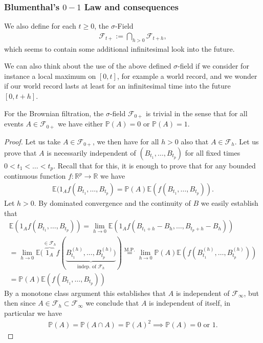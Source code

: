 \documentclass[../mainfile.tex]{subfiles}
\begin{document}
\subsubsection{Blumenthal's $0-1$ Law and consequences}
We also define for each $t \geq 0$, the $\sigma$-Field 
\begin{align*}
\mathcal{F}_{t+} := \bigcap_{h >0} \mathcal{F}_{t+h}, 
\end{align*}
which seems to contain some additional infinitesimal look into the future. 
\begin{rem} We can also think about the use of the above defined $\sigma$-field if we consider for instance a local maximum on $[0,t]$, for example a world record, and we wonder if our world record lasts at least for an infinitesimal time into the future $[0, t+h]$. 
\end{rem}
\newpage
\begin{prop} For the Brownian filtration, the $\sigma$-field $\mathcal{F}_{0+}$ is trivial in the sense that for all events $A \in \mathcal{F}_{0+}$ we have either $\mathbb{P}(A)=0$ or $\mathbb{P}(A)=1$. 
\end{prop}
\begin{proof}
Let us take $A \in \mathcal{F}_{0+}$, we then have for all $h>0$ also that $A \in \mathcal{F}_h$. Let us prove that $A$ is necessarily independent of $(B_{t_1}, \dots , B_{t_p})$ for all fixed times $0 < t_1< \dots < t_p$. Recall that for this, it is enough to prove that for any bounded continuous function $f: \mathbb{R}^p \to \mathbb{R}$ we have
\begin{align*}
\mathbb{E}(1_A f(B_{t_1},  \dots , B_{t_p}) = \mathbb{P}(A) \mathbb{E}(f (B_{t_1}, \dots , B_{t_p})).
\end{align*}
Let $h>0$. By dominated convergence and the continuity of $B$ we easily establish that 
\begin{align*}
\mathbb{E}(1_A f(B_{t_1},  \dots , B_{t_p})) = \lim_{h \to 0} \mathbb{E}(1_A f(B_{t_1+h}-B_h, \dots ,  B_{t_p+h}-B_h)) \\
= \lim_{h \to 0} \mathbb{E}(\overbrace{1_A}^{\in \mathcal{F}_h} f(\underbrace{B_{t_1}^{(h)}, \dots , B_{t_p}^{(h)})}_{\text{indep. of } \mathcal{F}_h}) \overset{\text{M.P.}}= \lim_{h \to 0} \mathbb{P}(A) \mathbb{E}(f(B_{t_1}^{(h)} , \dots , B_{t_p}^{(h)})) \\
= \mathbb{P}(A) \mathbb{E}(f(B_{t_1}, \dots , B_{t_p}))
\end{align*}
By a monotone class argument this establishes that $A$ is independent of $\mathcal{F}_\infty$, but then since $A \in \mathcal{F}_h \subset \mathcal{F}_\infty$ we conclude that $A$ is independent of itself, in particular we have
\begin{align*}
\mathbb{P}(A)= \mathbb{P}(A \cap A) = \mathbb{P}(A)^2 \implies \mathbb{P}(A) = 0 \text{ or } 1. 
\end{align*}
\end{proof}
\end{document}
